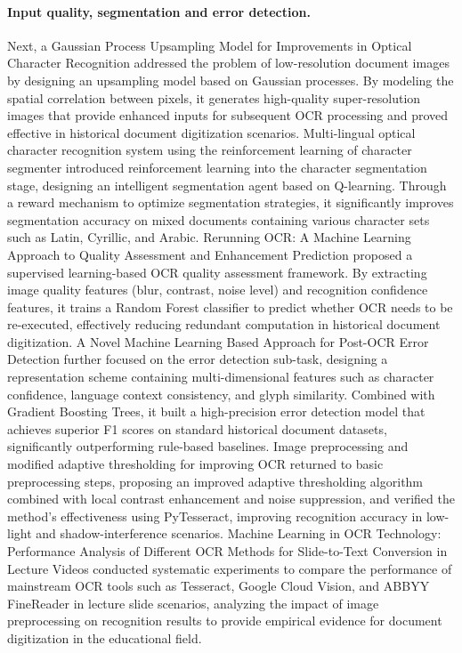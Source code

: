 \paragraph{Input quality, segmentation and error detection.}
Next, a Gaussian Process Upsampling Model for Improvements in Optical Character Recognition \cite{stefan2010gaussian} addressed the problem of low-resolution document images by designing an upsampling model based on Gaussian processes. By modeling the spatial correlation between pixels, it generates high-quality super-resolution images that provide enhanced inputs for subsequent OCR processing and proved effective in historical document digitization scenarios. Multi-lingual optical character recognition system using the reinforcement learning of character segmenter \cite{bae2012multilingual} introduced reinforcement learning into the character segmentation stage, designing an intelligent segmentation agent based on Q-learning. Through a reward mechanism to optimize segmentation strategies, it significantly improves segmentation accuracy on mixed documents containing various character sets such as Latin, Cyrillic, and Arabic. Rerunning OCR: A Machine Learning Approach to Quality Assessment and Enhancement Prediction \cite{mcdonald2016rerunning} proposed a supervised learning-based OCR quality assessment framework. By extracting image quality features (blur, contrast, noise level) and recognition confidence features, it trains a Random Forest classifier to predict whether OCR needs to be re-executed, effectively reducing redundant computation in historical document digitization. A Novel Machine Learning Based Approach for Post-OCR Error Detection \cite{nguyen2018postocr} further focused on the error detection sub-task, designing a representation scheme containing multi-dimensional features such as character confidence, language context consistency, and glyph similarity. Combined with Gradient Boosting Trees, it built a high-precision error detection model that achieves superior F1 scores on standard historical document datasets, significantly outperforming rule-based baselines. Image preprocessing and modified adaptive thresholding for improving OCR \cite{kumar2018adaptive} returned to basic preprocessing steps, proposing an improved adaptive thresholding algorithm combined with local contrast enhancement and noise suppression, and verified the method's effectiveness using PyTesseract, improving recognition accuracy in low-light and shadow-interference scenarios. Machine Learning in OCR Technology: Performance Analysis of Different OCR Methods for Slide-to-Text Conversion in Lecture Videos \cite{patel2020performance} conducted systematic experiments to compare the performance of mainstream OCR tools such as Tesseract, Google Cloud Vision, and ABBYY FineReader in lecture slide scenarios, analyzing the impact of image preprocessing on recognition results to provide empirical evidence for document digitization in the educational field.

